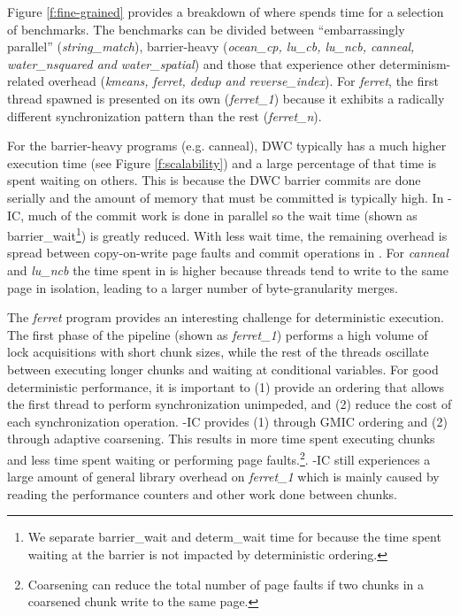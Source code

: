 Figure \ref{f:fine-grained} provides a breakdown of where \lib{} spends time for a selection of benchmarks. The benchmarks can be divided between ``embarrassingly parallel'' ({\it string\_match}), barrier-heavy ({\it ocean\_cp, lu\_cb, lu\_ncb, canneal, water\_nsquared and water\_spatial}) and those that experience other determinism-related overhead ({\it kmeans, ferret, dedup and reverse\_index}). For {\it ferret}, the first thread spawned is presented on its own ({\it ferret\_1}) because it exhibits a radically different synchronization pattern than the rest ({\it ferret\_n}).

For the barrier-heavy programs (e.g. canneal), DWC typically has a much higher execution time (see Figure \ref{f:scalability}) and a large percentage of that time is spent waiting on others. This is because the DWC barrier commits are done serially and the amount of memory that must be committed is typically high. In \lib{}-IC, much of the commit work is done in parallel so the wait time (shown as barrier\_wait\footnote{We separate barrier\_wait and determ\_wait time for \lib{} because the time spent waiting at the barrier is not impacted by deterministic ordering.}) is greatly reduced. With less wait time, the remaining overhead is spread between copy-on-write page faults and commit operations in \conversion{}. For {\it canneal} and {\it lu\_ncb} the time spent in \conversion{} is higher because threads tend to write to the same page in isolation, leading to a larger number of byte-granularity merges.

The {\it ferret} program provides an interesting challenge for deterministic execution. The first phase of the pipeline (shown as {\it ferret\_1}) performs a high volume of lock acquisitions with short chunk sizes, while the rest of the threads oscillate between executing longer chunks and waiting at conditional variables. For good deterministic performance, it is important to (1) provide an ordering that allows the first thread to perform synchronization unimpeded, and (2) reduce the cost of each synchronization operation. \lib{}-IC provides (1) through GMIC ordering and (2) through adaptive coarsening. This results in more time spent executing chunks and less time spent waiting or performing page faults.\footnote{Coarsening can reduce the total number of page faults if two chunks in a coarsened chunk write to the same page.}. \lib{}-IC still experiences a large amount of general library overhead on {\it ferret\_1} which is mainly caused by reading the performance counters and other work done between chunks.

